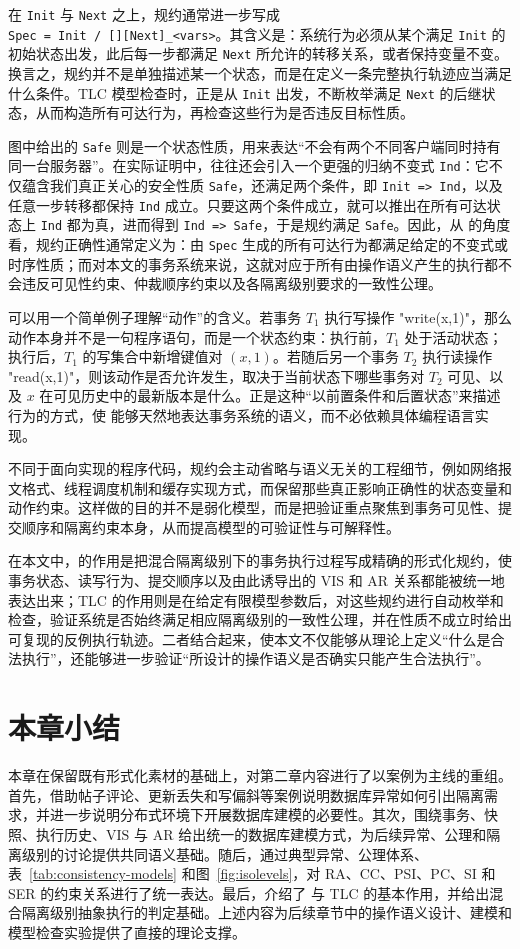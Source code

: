 在 \texttt{Init} 与 \texttt{Next} 之上，规约通常进一步写成\\ \texttt{Spec = Init /\ [][Next]\_<vars>}。其含义是：系统行为必须从某个满足 \texttt{Init} 的初始状态出发，此后每一步都满足 \texttt{Next} 所允许的转移关系，或者保持变量不变。换言之，规约并不是单独描述某一个状态，而是在定义一条完整执行轨迹应当满足什么条件。TLC 模型检查时，正是从 \texttt{Init} 出发，不断枚举满足 \texttt{Next} 的后继状态，从而构造所有可达行为，再检查这些行为是否违反目标性质。

图中给出的 \texttt{Safe} 则是一个状态性质，用来表达“不会有两个不同客户端同时持有同一台服务器”。在实际证明中，往往还会引入一个更强的归纳不变式 \texttt{Ind}：它不仅蕴含我们真正关心的安全性质 \texttt{Safe}，还满足两个条件，即 \texttt{Init => Ind}，以及任意一步转移都保持 \texttt{Ind} 成立。只要这两个条件成立，就可以推出在所有可达状态上 \texttt{Ind} 都为真，进而得到 \texttt{Ind => Safe}，于是规约满足 \texttt{Safe}。因此，从 \TLAPlus 的角度看，规约正确性通常定义为：由 \texttt{Spec} 生成的所有可达行为都满足给定的不变式或时序性质；而对本文的事务系统来说，这就对应于所有由操作语义产生的执行都不会违反可见性约束、仲裁顺序约束以及各隔离级别要求的一致性公理。

可以用一个简单例子理解“动作”的含义。若事务 $T_1$ 执行写操作 "write(x,1)"，那么动作本身并不是一句程序语句，而是一个状态约束：执行前，$T_1$ 处于活动状态；执行后，$T_1$ 的写集合中新增键值对 $(x,1)$。若随后另一个事务 $T_2$ 执行读操作 "read(x,1)"，则该动作是否允许发生，取决于当前状态下哪些事务对 $T_2$ 可见、以及 $x$ 在可见历史中的最新版本是什么。正是这种“以前置条件和后置状态”来描述行为的方式，使 \TLAPlus 能够天然地表达事务系统的语义，而不必依赖具体编程语言实现。

不同于面向实现的程序代码，\TLAPlus 规约会主动省略与语义无关的工程细节，例如网络报文格式、线程调度机制和缓存实现方式，而保留那些真正影响正确性的状态变量和动作约束。这样做的目的并不是弱化模型，而是把验证重点聚焦到事务可见性、提交顺序和隔离约束本身，从而提高模型的可验证性与可解释性。

在本文中，\TLAPlus 的作用是把混合隔离级别下的事务执行过程写成精确的形式化规约，使事务状态、读写行为、提交顺序以及由此诱导出的 $\text{VIS}$ 和 $\text{AR}$ 关系都能被统一地表达出来；TLC 的作用则是在给定有限模型参数后，对这些规约进行自动枚举和检查，验证系统是否始终满足相应隔离级别的一致性公理，并在性质不成立时给出可复现的反例执行轨迹。二者结合起来，使本文不仅能够从理论上定义“什么是合法执行”，还能够进一步验证“所设计的操作语义是否确实只能产生合法执行”。

\section{本章小结}
本章在保留既有形式化素材的基础上，对第二章内容进行了以案例为主线的重组。首先，借助帖子评论、更新丢失和写偏斜等案例说明数据库异常如何引出隔离需求，并进一步说明分布式环境下开展数据库建模的必要性。其次，围绕事务、快照、执行历史、$\text{VIS}$ 与 $\text{AR}$ 给出统一的数据库建模方式，为后续异常、公理和隔离级别的讨论提供共同语义基础。随后，通过典型异常、公理体系、表~\ref{tab:consistency-models} 和图~\ref{fig:isolevels}，对 RA、CC、PSI、PC、SI 和 SER 的约束关系进行了统一表达。最后，介绍了 \TLAPlus 与 TLC 的基本作用，并给出混合隔离级别抽象执行的判定基础。上述内容为后续章节中的操作语义设计、\TLAPlus 建模和模型检查实验提供了直接的理论支撑。
